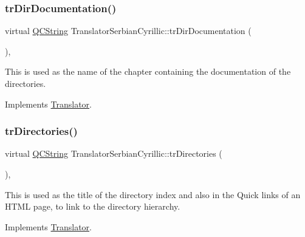 \mbox{\label{class_translator_serbian_cyrillic_a5a3e3b75d44c7a5c89da83714d7b11ed}} 
\subsubsection{\texorpdfstring{trDirDocumentation()}{trDirDocumentation()}}
{\footnotesize\ttfamily virtual \mbox{\hyperlink{class_q_c_string}{Q\+C\+String}} Translator\+Serbian\+Cyrillic\+::tr\+Dir\+Documentation (\begin{DoxyParamCaption}{ }\end{DoxyParamCaption})\hspace{0.3cm}{\ttfamily [inline]}, {\ttfamily [virtual]}}

This is used as the name of the chapter containing the documentation of the directories. 

Implements \mbox{\hyperlink{class_translator}{Translator}}.

\mbox{\label{class_translator_serbian_cyrillic_a19c86d2bbfd1a361dd368ce8b18b98eb}} 
\subsubsection{\texorpdfstring{trDirectories()}{trDirectories()}}
{\footnotesize\ttfamily virtual \mbox{\hyperlink{class_q_c_string}{Q\+C\+String}} Translator\+Serbian\+Cyrillic\+::tr\+Directories (\begin{DoxyParamCaption}{ }\end{DoxyParamCaption})\hspace{0.3cm}{\ttfamily [inline]}, {\ttfamily [virtual]}}

This is used as the title of the directory index and also in the Quick links of an H\+T\+ML page, to link to the directory hierarchy. 

Implements \mbox{\hyperlink{class_translator}{Translator}}.

\mbox{\label{class_translator_serbian_cyrillic_a1cb5135de77bcea1777a1a7c3ee227b9}} 
